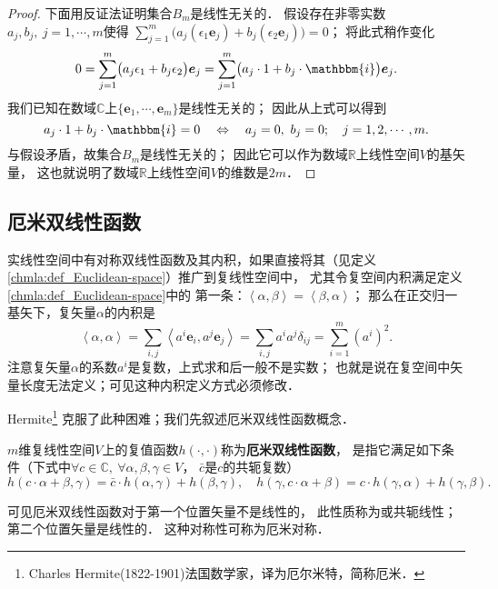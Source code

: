 \begin{proof}
下面用反证法证明集合$B_m$是线性无关的．
假设存在非零实数$a_{j},b_j,\ j=1,\cdots,m$使得
$\sum_{j=1}^{m}\bigl(a_j (\epsilon_1 \boldsymbol{e}_j )+ b_j (\epsilon_2 \boldsymbol{e}_j )\bigr)= 0$；
将此式稍作变化
\begin{equation}
    0=\sum_{j=1}^{m}\bigl(a_j \epsilon_1 + b_j \epsilon_2 \bigr) \boldsymbol{e}_j
     =\sum_{j=1}^{m}\bigl(a_j \cdot 1 + b_j \cdot \mathbbm{i}\bigr) \boldsymbol{e}_j .
\end{equation}
我们已知在数域$\mathbb{C}$上$\{\boldsymbol{e}_1,\cdots,\boldsymbol{e}_m\}$是线性无关的；
因此从上式可以得到
\begin{equation}
    a_j \cdot 1 + b_j \cdot \mathbbm{i}=0\quad \Leftrightarrow \quad
    a_j=0,\ b_j =0; \quad j=1,2,\cdots,m.
\end{equation}
与假设矛盾，故集合$B_m$是线性无关的；
因此它可以作为数域$\mathbb{R}$上线性空间$V$的基矢量，
这也就说明了数域$\mathbb{R}$上线性空间$V$的维数是$2m$．
\end{proof}



\subsection{厄米双线性函数}
实线性空间中有对称双线性函数及其内积，如果直接将其（见定义\ref{chmla:def_Euclidean-space}）推广到复线性空间中，
尤其令复空间内积满足定义\ref{chmla:def_Euclidean-space}中的
第一条：$\left<\alpha,\beta\right>=\left<\beta,\alpha\right>$；
那么在正交归一基矢下，复矢量$\alpha$的内积是
\begin{equation}
    \left<\alpha,\alpha\right> = \sum_{i,j}\left<a^i \boldsymbol{e}_i, a^j\boldsymbol{e}_j\right>
    =\sum_{i,j} a^i a^j \delta_{ij} = \sum_{i=1}^{m} (a^i)^2 .
\end{equation}
注意复矢量$\alpha$的系数$a^i$是复数，上式求和后一般不是实数；
也就是说在复空间中矢量长度无法定义；可见这种内积定义方式必须修改． 

Hermite{\footnote{Charles Hermite(1822-1901)法国数学家，译为厄尔米特，简称厄米．}}
克服了此种困难；我们先叙述厄米双线性函数概念．
\begin{definition}
    $m$维复线性空间$V$上的复值函数$h(\cdot,\cdot)$称为{\bfseries\heiti 厄米双线性函数}，
    是指它满足如下条件（下式中$\forall c\in \mathbb{C},\  \forall \alpha,\beta,\gamma\in V$，
    $\bar{c}$是$c$的共轭复数）
    \begin{equation*}
        h(c\cdot \alpha+\beta,\gamma) = \bar{c}\cdot h(\alpha,\gamma)+ h(\beta,\gamma),\quad
        h(\gamma,c\cdot \alpha+\beta) = c\cdot h(\gamma,\alpha)+ h(\gamma,\beta).
    \end{equation*}
\end{definition}
可见厄米{\kaishu 双线性}函数对于第一个位置矢量不是线性的，
此性质称为或{\heiti 共轭线性}；第二个位置矢量是线性的．
这种对称性可称为{\heiti 厄米对称}．

